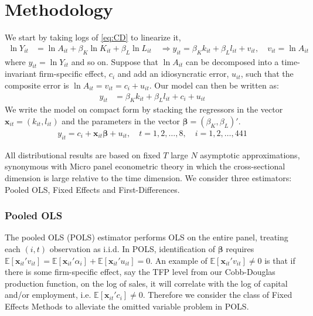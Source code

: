 \section{Methodology} \label{sec:methodology}

We start by taking logs of \eqref{eq:CD} to linearize it,
\begin{align*}
    \ln Y_{it} &= \ln A_{it} + \beta_K \ln K_{it} + \beta_L \ln L_{it} \quad \Longrightarrow
    y_{it} = \beta_K k_{it} + \beta_L l_{it} + v_{it}, \quad v_{it} = \ln A_{it}
\end{align*}
where $y_{it} = \ln Y_{it}$ and so on. Suppose that $\ln A_{it}$ can be decomposed into a time-invariant firm-specific effect, $c_i$ and add an idiosyncratic error, $u_{it}$, such that the composite error is $\ln A_{it}=v_{it} = c_i + u_{it}$. Our model can then be written as:
\begin{align*}
    y_{it} &= \beta_K k_{it} + \beta_L l_{it}+c_i + u_{it}
\end{align*}
We write the model on compact form by stacking the regressors in the vector $\bm{x}_{it} = (k_{it}, l_{it})$ and the parameters in the vector $\bm{\beta} = (\beta_K, \beta_L)'$.
\begin{align} \label{equationline}
    y_{it} = c_i + \bm{x}_{it} \bm{\beta} + u_{it}, \quad t=1,2,\ldots,8, \quad i=1,2,\ldots,441
\end{align}

All distributional results are based on fixed $T$ large $N$ asymptotic approximations, synonymous with Micro panel econometric theory in which the cross-sectional dimension is large relative to the time dimension. We consider three estimators: Pooled OLS, Fixed Effects and First-Differences.  

\subsubsection*{Pooled OLS}
The pooled OLS (POLS) estimator performs OLS on the entire panel, treating each $(i,t)$ observation as i.i.d. In POLS, identification of $\pmb{\beta}$ requires  $\mathbb{E}[\pmb{x}_{it}'v_{it}]=\mathbb{E}[\pmb{x}_{it}'\alpha_{i}]+\mathbb{E}[\pmb{x}_{it}'u_{it}]=0$.
An example of $\mathbb{E}[\pmb{x}_{it}'v_{it}]\neq0$ is that if there is some firm-specific effect, say the TFP level from our Cobb-Douglas production function, on the log of sales, it will correlate with the log of capital and/or employment, i.e. $\mathbb{E}[\pmb{x}_{it}'c_{i}]\neq0$. Therefore we consider the class of Fixed Effects Methods to alleviate the omitted variable problem in POLS.

